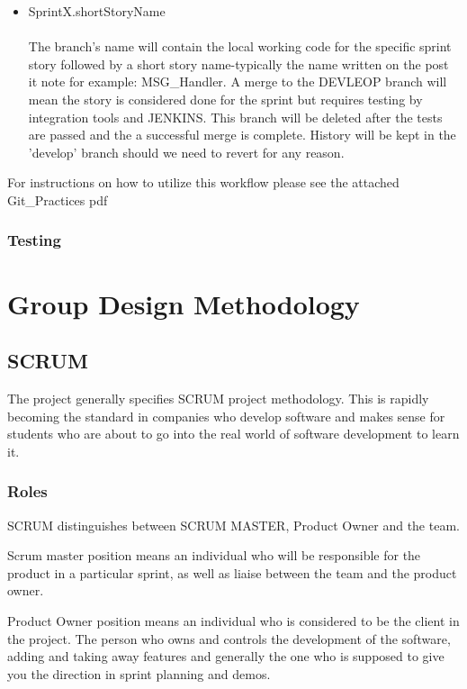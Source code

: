\documentclass[11pt]{report}
\begin{document}
\begin{itemize}
\item SprintX.shortStoryName\\ \\
The branch's name will contain the local working code for the specific sprint story followed by a short story name-typically the name written on the post it note for example: MSG\_Handler. A merge to the DEVLEOP branch will mean the story is considered done for the sprint but requires testing by integration tools and JENKINS. This branch will be deleted after the tests are passed and the a successful merge is complete. History will be kept in the 'develop' branch should we need to revert for any reason. 
\end{itemize}

For instructions on how to utilize this workflow please see the attached Git\_Practices pdf


\subsection{Testing}
\chapter{Group Design Methodology}
\section{SCRUM}

The project generally specifies SCRUM project methodology. This is rapidly becoming the standard in companies who develop software and makes sense for students who are about to go into the real world of software development to learn it.

\subsection{Roles}

SCRUM distinguishes between SCRUM MASTER, Product Owner and the team. 

Scrum master position means an individual who will be responsible for the product in a particular sprint, as well as liaise between the team and the product owner.

Product Owner position means an individual who is considered to be the client in the project. The person who owns and controls the development of the software, adding and taking away features and generally the one who is supposed to give you the direction in sprint planning and demos.
\end{document}
